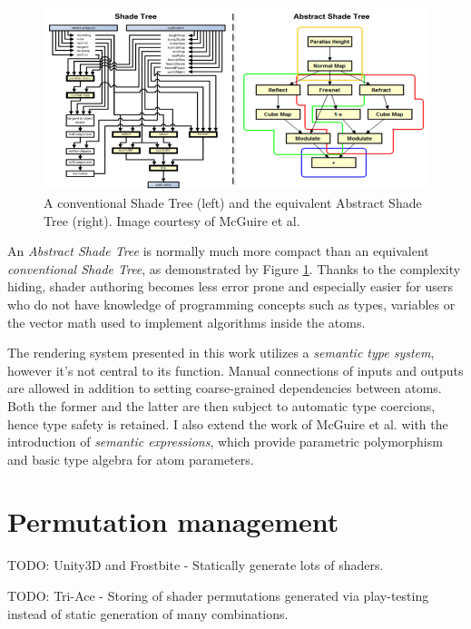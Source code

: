 \begin{figure}[h!]
  \centering
    \includegraphics[width=0.9\linewidth]{./Chapters/AbstractShadeTree.jpg}
    \caption[Abstract Shade Tree]{A conventional Shade Tree (left) and the equivalent Abstract Shade Tree (right). Image courtesy of McGuire et al.}
  \label{fig:AbstractShadeTree}
\end{figure}

An \emph{Abstract Shade Tree} is normally much more compact than an equivalent \emph{conventional Shade Tree}, as demonstrated by Figure \ref{fig:AbstractShadeTree}. Thanks to the complexity hiding, shader authoring becomes less error prone and especially easier for users who do not have knowledge of programming concepts such as types, variables or the vector math used to implement algorithms inside the atoms.
 
The rendering system presented in this work utilizes a \emph{semantic type system}, however it's not central to its function. Manual connections of inputs and outputs are allowed in addition to setting coarse-grained dependencies between atoms. Both the former and the latter are then subject to automatic type coercions, hence type safety is retained. I also extend the work of McGuire et al. with the introduction of \emph{semantic expressions}, which provide parametric polymorphism and basic type algebra for atom parameters.

\section{Permutation management}

TODO: Unity3D and Frostbite - Statically generate lots of shaders.

TODO: Tri-Ace - Storing of shader permutations generated via play-testing instead of static generation of many combinations.
